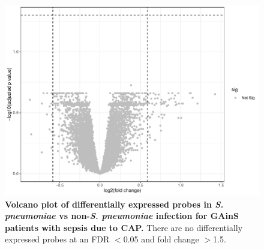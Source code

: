 \FloatBarrier
\begin{figure}[htbp]
\centering
\includegraphics[width=\textwidth]{./Results3/Images/vp-strep.pdf}
\caption[Volcano plot of differentially expressed probes in \textit{S. pneumoniae} infection]{\textbf{Volcano plot of differentially expressed probes in \textit{S. pneumoniae} vs non-\textit{S. pneumoniae} infection for GAinS patients with sepsis due to CAP.} There are no differentially expressed probes at an FDR $<$0.05 and fold change $>$1.5.}
\label{fig:vp-viral-bacterial}
\end{figure}
\FloatBarrier


